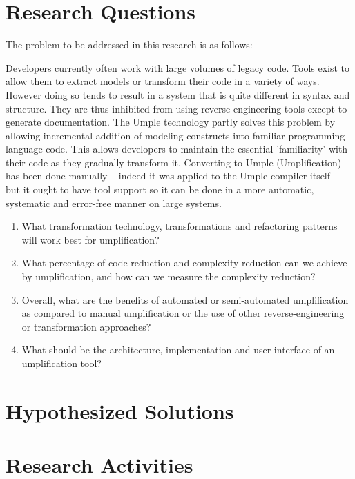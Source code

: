 \section{Research Questions}
\label{sec:researchQuestions}
The problem to be addressed in this research is as follows:

Developers currently often work with large volumes of legacy code. Tools exist to allow them to extract models or transform their code in a variety of ways. However doing so tends to result in a system that is quite different in syntax and structure. They are thus inhibited from using reverse engineering tools except to generate documentation. The Umple technology partly solves this problem by allowing incremental addition of modeling constructs into familiar programming language code. This allows developers to maintain the essential 'familiarity' with their code as they gradually transform it. Converting to Umple (Umplification) has been done manually – indeed it was applied to the Umple compiler itself \cite{Lethbridge2010c} –  but it ought to have tool support so it can be done in a more automatic, systematic and error-free manner on large systems.

\begin{enumerate}

\item What transformation technology, transformations and refactoring patterns will work best for umplification?
\item What percentage of code reduction and complexity reduction can we achieve by umplification, and how can we measure the complexity reduction?
\item Overall, what are the benefits of automated or semi-automated umplification as compared to manual umplification or the use of other reverse-engineering or transformation approaches?
\item What should be the architecture, implementation and user interface of an umplification tool?

\end{enumerate}

\section{Hypothesized Solutions}
\label{sec:solutions}

\section{Research Activities}

